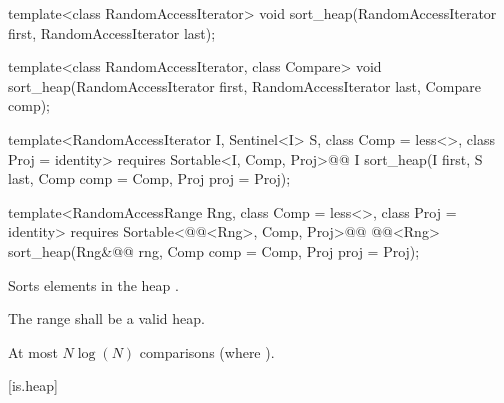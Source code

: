 %
\begin{removedblock}
\begin{itemdecl}
template<class RandomAccessIterator>
  void sort_heap(RandomAccessIterator first, RandomAccessIterator last);

template<class RandomAccessIterator, class Compare>
  void sort_heap(RandomAccessIterator first, RandomAccessIterator last,
                 Compare comp);
\end{itemdecl}
\end{removedblock}
\begin{addedblock}
\begin{itemdecl}
template<RandomAccessIterator I, Sentinel<I> S, class Comp = less<>,
    class Proj = identity>
  requires Sortable<I, Comp, Proj>@\newtxt{()}@
  I sort_heap(I first, S last, Comp comp = Comp{}, Proj proj = Proj{});

template<RandomAccessRange Rng, class Comp = less<>, class Proj = identity>
  requires Sortable<@@<Rng>, Comp, Proj>@\newtxt{()}@
  @@<Rng>
    sort_heap(Rng&@\newtxt{\&}@ rng, Comp comp = Comp{}, Proj proj = Proj{});
\end{itemdecl}
\end{addedblock}

\begin{itemdescr}
\pnum
\effects
Sorts elements in the heap
.

\pnum
\requires The range  shall be a valid heap.

\begin{addedblock}
\pnum
\returns {}
\end{addedblock}

\pnum
\complexity
At most $N \log(N)$
comparisons (where
).
\end{itemdescr}

[is.heap]{}

